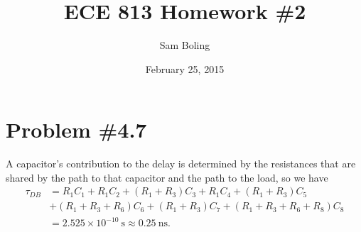 \documentclass{article}
\title{ECE 813 Homework \#2}
\author{Sam Boling}
\date{February 25, 2015}
\begin{document}
\maketitle

\section*{Problem \#4.7}
A capacitor's contribution to the delay
is determined by the resistances that are shared by the path
to that capacitor and the path to the load, so we have
\begin{align*}
\tau_{DB}
&=
    R_1                     C_1
  + R_1                     C_2
  + (R_1 + R_3)             C_3 
  + R_1                     C_4
  + (R_1 + R_3)             C_5 \\
 &+ (R_1 + R_3 + R_6)        C_6
  + (R_1 + R_3)             C_7
  + (R_1 + R_3 + R_6 + R_8) C_8 \\
&= 2.525 \times 10^{-10} ~\mathrm{s}
 \approx 0.25 ~\mathrm{ns}.
\end{align*}
\end{document}
